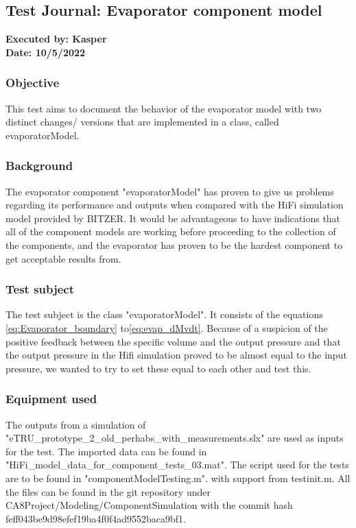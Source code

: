 \subsection{Test Journal: Evaporator component model} \label{app:tj_1}

\textbf{Executed by: Kasper} \\
\textbf{Date: 10/5/2022}

\subsubsection*{Objective}
This test aims to document the behavior of the evaporator model with two distinct changes/ versions that are implemented in a class, called evaporatorModel.

\subsubsection*{Background}
The evaporator component "evaporatorModel" has proven to give us problems regarding its performance and outputs when compared with the HiFi simulation model provided by BITZER.
It would be advantageous to have indications that all of the component models are working before proceeding to the collection of the components, and the evaporator has proven to be the hardest component to get acceptable results from.

\subsubsection*{Test subject}
The test subject is the class "evaporatorModel". It consists of the equations \cref{eq:Evaporator_boundary} to\cref{eq:evap_dMvdt}.
Because of a suspicion of the positive feedback between the specific volume and the output pressure and that the output pressure in the Hifi simulation proved to be almost equal to the input pressure, we wanted to try to set these equal to each other and test this.

\subsubsection*{Equipment used}
The outputs from a simulation of "eTRU\_prototype\_2\_old\_perhabs\_with\_measurements.slx" are used as inputs for the test. The imported data can be found in "HiFi\_model\_data\_for\_component\_tests\_03.mat".
The script used for the tests are to be found in "componentModelTesting.m". with support from testinit.m.
All the files can be found in the git repository under CA8Project/Modeling/ComponentSimulation with the commit hash feff043be9d98efef19ba4f0f4ad9552baca9bf1.

